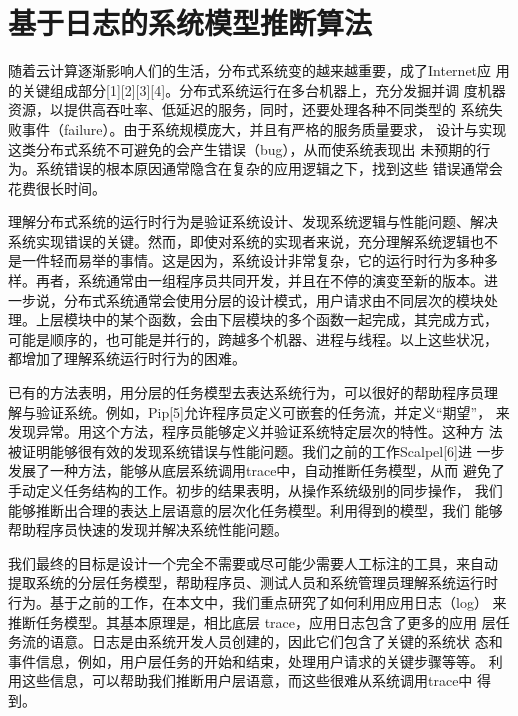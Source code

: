 \chapter{基于日志的系统模型推断算法}
\label{chap:logmining}

随着云计算逐渐影响人们的生活，分布式系统变的越来越重要，成了Internet应
用的关键组成部分[1][2][3][4]。分布式系统运行在多台机器上，充分发掘并调
度机器资源，以提供高吞吐率、低延迟的服务，同时，还要处理各种不同类型的
系统失败事件（failure）。由于系统规模庞大，并且有严格的服务质量要求，
设计与实现这类分布式系统不可避免的会产生错误（bug），从而使系统表现出
未预期的行为。系统错误的根本原因通常隐含在复杂的应用逻辑之下，找到这些
错误通常会花费很长时间。

理解分布式系统的运行时行为是验证系统设计、发现系统逻辑与性能问题、解决
系统实现错误的关键。然而，即使对系统的实现者来说，充分理解系统逻辑也不
是一件轻而易举的事情。这是因为，系统设计非常复杂，它的运行时行为多种多
样。再者，系统通常由一组程序员共同开发，并且在不停的演变至新的版本。进
一步说，分布式系统通常会使用分层的设计模式，用户请求由不同层次的模块处
理。上层模块中的某个函数，会由下层模块的多个函数一起完成，其完成方式，
可能是顺序的，也可能是并行的，跨越多个机器、进程与线程。以上这些状况，
都增加了理解系统运行时行为的困难。

已有的方法表明，用分层的任务模型去表达系统行为，可以很好的帮助程序员理
解与验证系统。例如，Pip[5]允许程序员定义可嵌套的任务流，并定义“期望”，
来发现异常。用这个方法，程序员能够定义并验证系统特定层次的特性。这种方
法被证明能够很有效的发现系统错误与性能问题。我们之前的工作Scalpel[6]进
一步发展了一种方法，能够从底层系统调用trace中，自动推断任务模型，从而
避免了手动定义任务结构的工作。初步的结果表明，从操作系统级别的同步操作，
我们能够推断出合理的表达上层语意的层次化任务模型。利用得到的模型，我们
能够帮助程序员快速的发现并解决系统性能问题。

我们最终的目标是设计一个完全不需要或尽可能少需要人工标注的工具，来自动
提取系统的分层任务模型，帮助程序员、测试人员和系统管理员理解系统运行时
行为。基于之前的工作，在本文中，我们重点研究了如何利用应用日志（log）
来推断任务模型。其基本原理是，相比底层 trace，应用日志包含了更多的应用
层任务流的语意。日志是由系统开发人员创建的，因此它们包含了关键的系统状
态和事件信息，例如，用户层任务的开始和结束，处理用户请求的关键步骤等等。
利用这些信息，可以帮助我们推断用户层语意，而这些很难从系统调用trace中
得到。

